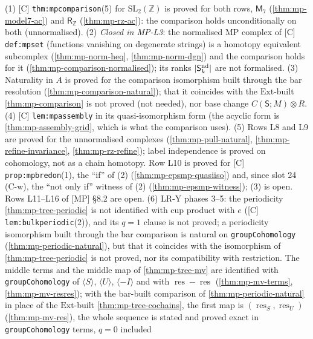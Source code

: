 \begin{remark}\label{rmk:mp-open}
  (1) [C] \texttt{thm:mpcomparison}(5) for $\mathrm{SL}_2(\mathbb Z)$ is proved for both rows, $\mathsf M_7$ (\ref{thm:mp-model7-ac})
  and $\mathsf R_{\mathbb Z}$ (\ref{thm:mp-rz-ac}): the comparison holds unconditionally on both (unnormalised).
  (2) \emph{Closed in MP-L3}: the normalised MP complex of [C] \texttt{def:mpset} (functions vanishing on degenerate strings)
  is a homotopy equivalent subcomplex (\ref{thm:mp-norm-heq}, \ref{thm:mp-norm-dgn}) and the comparison holds for it
  (\ref{thm:mp-comparison-normalised}); its ranks $\lvert\mathsf S_k^{\mathrm{nd}}\rvert$ are not formalised.  (3) Naturality in $A$ is proved for the comparison isomorphism built
  through the bar resolution (\ref{thm:mp-comparison-natural}); that it coincides with the $\mathrm{Ext}$-built
  \ref{thm:mp-comparison} is not proved (not needed), nor base change $C(\mathsf S;M)\otimes R$.  (4) [C] \texttt{lem:mpassembly} in its quasi-isomorphism form (the acyclic form is
  \ref{thm:mp-assembly-grid}, which is what the comparison uses).  (5) Rows L8 and L9 are proved for the unnormalised complexes (\ref{thm:mp-pull-natural}, \ref{thm:mp-refine-invariance}, \ref{thm:mp-rz-refine}); label independence is proved on cohomology, not as a chain homotopy.  Row L10 is proved for [C] \texttt{prop:mpbredon}(1), the ``if'' of (2) (\ref{thm:mp-epsmp-quasiiso}) and, since slot 24 (C-w), the ``not only if'' witness of (2) (\ref{thm:mp-epsmp-witness}); (3) is open.  Rows L11--L16 of [MP] \S8.2 are open.  (6) LR-Y phases 3--5: the periodicity \ref{thm:mp-tree-periodic} is not identified with cup product with $e$ ([C]
  \texttt{lem:bulkperiodic}(2)), and its $q=1$ clause is not proved; a periodicity isomorphism built through the bar comparison
  is natural on \texttt{groupCohomology} (\ref{thm:mp-periodic-natural}), but that it coincides with the isomorphism of
  \ref{thm:mp-tree-periodic} is not proved, nor its compatibility with restriction.  The middle terms and the middle map of \ref{thm:mp-tree-mv} are identified with
  \texttt{groupCohomology} of $\langle S\rangle$, $\langle U\rangle$, $\langle-I\rangle$ and with $\operatorname{res}-\operatorname{res}$
  (\ref{thm:mp-mv-terms}, \ref{thm:mp-mv-resres}); with the bar-built comparison of \ref{thm:mp-periodic-natural} in place of
  the $\mathrm{Ext}$-built \ref{thm:mp-tree-cochains}, the first map is $(\operatorname{res}_S,\operatorname{res}_U)$
  (\ref{thm:mp-mv-res}), the whole sequence is stated and proved exact in \texttt{groupCohomology} terms, $q=0$ included

\end{remark}
